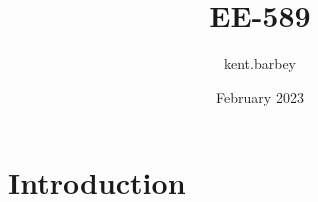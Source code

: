 \documentclass{article}
\title{EE-589}
\author{kent.barbey }
\date{February 2023}
\begin{document}
\maketitle

\section{Introduction}
\end{document}
